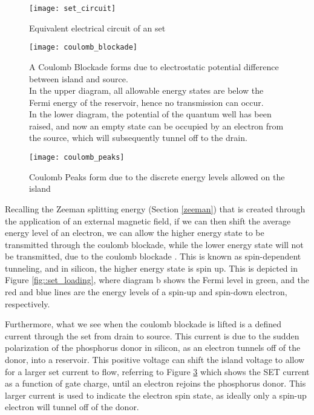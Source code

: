 \begin{figure}[htbp!]
	\centering
	\texttt{[image: set\_circuit]}
	\caption[Equivalent circuit of an \gls{set}]{Equivalent electrical circuit of an \gls{set}\cite{devoret2000amplifying}}
	\label{fig::set_circuit}
\end{figure}

\begin{figure}[htbp!]
	\centering
	\texttt{[image: coulomb\_blockade]}
	\caption[A Coulomb Blockade]{A Coulomb Blockade \cite{coulomb_blockade} forms due to electrostatic potential difference between island and source.\\ In the upper diagram, all allowable energy states are below the Fermi energy of the reservoir, hence no transmission can occur.\\ In the lower diagram, the potential of the quantum well has been raised, and now an empty state can be occupied by an electron from the source, which will subsequently tunnel off to the drain.}
	\label{fig::coulomb_blockade}
\end{figure}

\begin{figure}[htbp!]
	\centering
	\texttt{[image: coulomb\_peaks]}
	\caption[Coulomb Peaks]{Coulomb Peaks form due to the discrete energy levels allowed on the island\cite{elec9705_lecture}}
	\label{fig::coulomb_peaks}
\end{figure}



Recalling the Zeeman splitting energy (Section \ref{zeeman}) that is created through the application of an external magnetic field, if we can then shift the average energy level of an electron, we can allow the higher energy state to be transmitted through the coulomb blockade, while the lower energy state will not be transmitted, due to the coulomb blockade . This is known as spin-dependent tunneling, and in silicon, the higher energy state is spin up. This is depicted in Figure \ref{fig::set_loading}, where diagram b shows the Fermi level in green, and the red and blue lines are the energy levels of a spin-up and spin-down electron, respectively. 

Furthermore, what we see when the coulomb blockade is lifted is a defined current through the \gls{set} from drain to source. This current is due to the sudden polarization of the phosphorus donor in silicon, as an electron tunnels off of the donor, into a reservoir. This positive voltage can shift the island voltage to allow for a larger \gls{set} current to flow, referring to Figure \ref{fig::coulomb_peaks} which shows the SET current as a function of gate charge, until an electron rejoins the phosphorus donor. This larger current is used to indicate the electron spin state, as ideally only a spin-up electron will tunnel off of the donor.

